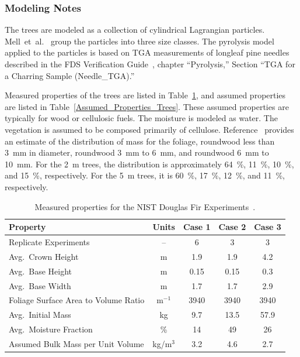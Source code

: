 \subsubsection{Modeling Notes}

The trees are modeled as a collection of cylindrical Lagrangian particles. Mell~et~al.~\cite{Mell:2009} group the particles into three size classes. The pyrolysis model applied to the particles is based on TGA measurements of longleaf pine needles described in the FDS Verification Guide~\cite{FDS_Verification_Guide}, chapter ``Pyrolysis,'' Section ``TGA for a Charring Sample (Needle\_TGA).''

Measured properties of the trees are listed in Table~\ref{Properties_Trees}, and assumed properties are listed in Table~\ref{Assumed_Properties_Trees}. These assumed properties are typically for wood or cellulosic fuels. The moisture is modeled as water. The vegetation is assumed to be composed primarily of cellulose. Reference~\cite{Mell:2009} provides an estimate of the distribution of mass for the foliage, roundwood less than 3~mm in diameter, roundwood 3~mm to 6~mm, and roundwood 6~mm to 10~mm. For the 2~m trees, the distribution is approximately 64~\%, 11~\%, 10~\%, and 15~\%, respectively. For the 5~m trees, it is 60~\%, 17~\%, 12~\%, and 11~\%, respectively.

\begin{table}[ht]
\begin{center}
\caption[Measured properties for the NIST Douglas Fir Experiments]{Measured properties for the NIST Douglas Fir Experiments~\cite{Mell:2009}.}
\label{Properties_Trees}
\begin{tabular}{|l|c|c|c|c|}
\hline
Property                                & Units         & Case 1        & Case 2        & Case 3     \\ \hline \hline
Replicate Experiments                   & --            & 6             & 3             & 3          \\ \hline
Avg.~Crown Height                       & m             & 1.9           & 1.9           & 4.2        \\ \hline
Avg.~Base Height                        & m             & 0.15          & 0.15          & 0.3        \\ \hline
Avg.~Base Width                         & m             & 1.7           & 1.7           & 2.9        \\ \hline
Foliage Surface Area to Volume Ratio    & m$^{-1}$      & 3940          & 3940          & 3940       \\ \hline
Avg.~Initial Mass                       & kg            & 9.7           & 13.5          & 57.9       \\ \hline
Avg.~Moisture Fraction                  & \%            & 14            & 49            & 26         \\ \hline
Assumed Bulk Mass per Unit Volume       & kg/m$^3$      & 3.2           & 4.6           & 2.7        \\ \hline
\end{tabular}
\end{center}
\end{table}

